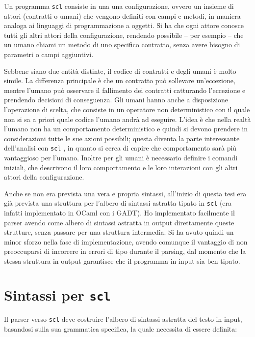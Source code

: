 \documentclass[12pt,a4paper]{report}
\begin{document}
Un programma \texttt{scl} consiste in una una configurazione, ovvero un
insieme di attori (contratti o umani) che vengono definiti con campi e
metodi, in maniera analoga ai linguaggi di programmazione a oggetti. Si
ha che ogni attore conosce tutti gli altri attori della configurazione,
rendendo possibile -- per esempio -- che un umano chiami un metodo di
uno specifico contratto, senza avere bisogno di parametri o campi
aggiuntivi.

Sebbene siano due entità distinte, il codice di contratti e degli umani
è molto simile. La differenza principale è che un contratto può
sollevare un'eccezione, mentre l'umano può osservare il fallimento dei
contratti catturando l'eccezione e prendendo decisioni di conseguenza.
Gli umani hanno anche a disposizione l'operazione di scelta, che
consiste in un operatore non deterministico con il quale non si sa a
priori quale codice l'umano andrà ad eseguire. L'idea è che nella realtà
l'umano non ha un comportamento deterministico e quindi si devono
prendere in considerazioni tutte le sue azioni possibili; questa diventa
la parte interessante dell'analisi con \texttt{scl} , in quanto si cerca
di capire che comportamento sarà più vantaggioso per l'umano. Inoltre
per gli umani è necessario definire i comandi iniziali, che descrivono
il loro comportamento e le loro interazioni con gli altri attori della
configurazione.

Anche se non era prevista una vera e propria sintassi, all'inizio di
questa tesi era già prevista una struttura per l'albero di sintassi
astratta tipato in \texttt{scl} (era infatti implementato in OCaml con i
GADT). Ho implementato facilmente il parser avendo come albero di
sintassi astratta in output direttamente queste strutture, senza passare
per una struttura intermedia. Si ha avuto quindi un minor sforzo nella
fase di implementazione, avendo comunque il vantaggio di non
preoccuparsi di incorrere in errori di tipo durante il parsing, dal
momento che la stessa struttura in output garantisce che il programma in
input sia ben tipato.

\hypertarget{sintassi-per-scl}{%
\section{\texorpdfstring{Sintassi per
\texttt{scl}}{Sintassi per scl}}\label{sintassi-per-scl}}

Il parser verso \texttt{scl} deve costruire l'albero di sintassi
astratta del testo in input, basandosi sulla sua grammatica specifica,
la quale necessita di essere definita:
\end{document}
